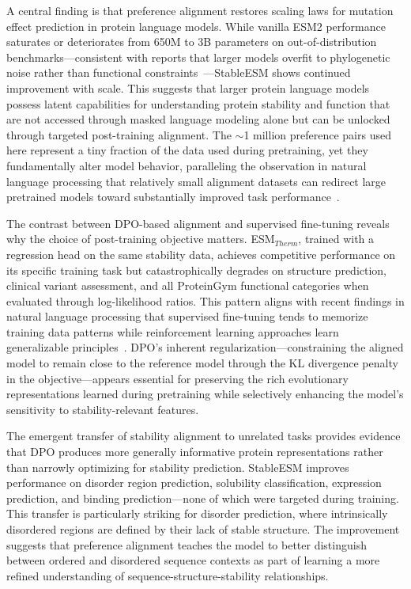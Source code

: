 \documentclass[]{fairmeta}
\begin{document}
A central finding is that preference alignment restores scaling laws for mutation effect prediction in protein language models.
While vanilla ESM2 performance saturates or deteriorates from 650M to 3B parameters on out-of-distribution benchmarks—consistent with reports that larger models overfit to phylogenetic noise rather than functional constraints~\citep{weinstein2022non,hou2025understanding}—StableESM shows continued improvement with scale.
This suggests that larger protein language models possess latent capabilities for understanding protein stability and function that are not accessed through masked language modeling alone but can be unlocked through targeted post-training alignment.
The $\sim$1 million preference pairs used here represent a tiny fraction of the data used during pretraining, yet they fundamentally alter model behavior, paralleling the observation in natural language processing that relatively small alignment datasets can redirect large pretrained models toward substantially improved task performance~\citep{ouyang2022training}.

The contrast between DPO-based alignment and supervised fine-tuning reveals why the choice of post-training objective matters.
ESM$_{Therm}$, trained with a regression head on the same stability data, achieves competitive performance on its specific training task but catastrophically degrades on structure prediction, clinical variant assessment, and all ProteinGym functional categories when evaluated through log-likelihood ratios.
This pattern aligns with recent findings in natural language processing that supervised fine-tuning tends to memorize training data patterns while reinforcement learning approaches learn generalizable principles~\citep{chu2025sft}.
DPO's inherent regularization—constraining the aligned model to remain close to the reference model through the KL divergence penalty in the objective—appears essential for preserving the rich evolutionary representations learned during pretraining while selectively enhancing the model's sensitivity to stability-relevant features.

The emergent transfer of stability alignment to unrelated tasks provides evidence that DPO produces more generally informative protein representations rather than narrowly optimizing for stability prediction.
StableESM improves performance on disorder region prediction, solubility classification, expression prediction, and binding prediction—none of which were targeted during training.
This transfer is particularly striking for disorder prediction, where intrinsically disordered regions are defined by their lack of stable structure.
The improvement suggests that preference alignment teaches the model to better distinguish between ordered and disordered sequence contexts as part of learning a more refined understanding of sequence-structure-stability relationships.
\end{document}
